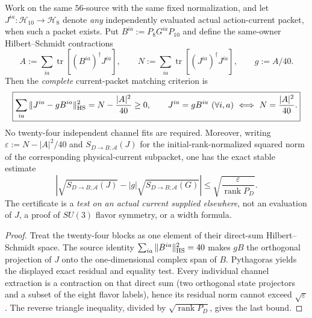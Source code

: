 \documentclass[12pt,a4paper]{article}
\begin{document}
\begin{corollary}
\label{p11:cor:v371-axial-current-gram-test}
Work on the same $56$-source with the same fixed normalization,
and let $J^{ia}:\mathcal H_{10}\to\mathcal H_8$ denote \emph{any}
independently evaluated actual action-current packet, when such a
packet exists.  Put $B^{ia}:=P_8G^{ia}P_{10}$ and define the
same-owner Hilbert--Schmidt contractions
\[
 A:=\sum_{ia}\operatorname{tr}[(B^{ia})^\dagger J^{ia}],
 \qquad N:=\sum_{ia}\operatorname{tr}[(J^{ia})^\dagger J^{ia}],
 \qquad g:=A/40.
\]
Then the \emph{complete} current-packet matching criterion is
\[
 \boxed{\sum_{ia}\|J^{ia}-gB^{ia}\|_{\rm HS}^2
 =N-\frac{|A|^2}{40}\ge0,\qquad
 J^{ia}=gB^{ia}\ (\forall i,a)
 \ \Longleftrightarrow\ N=\frac{|A|^2}{40}.}
\]
No twenty-four independent channel fits are required.  Moreover,
writing $\varepsilon:=N-|A|^2/40$ and $S_{D\to B;\mathcal A}(J)$
for the initial-rank-normalized squared norm of the corresponding
physical-current subpacket, one has the exact stable estimate
\[
 \boxed{\left|\sqrt{S_{D\to B;\mathcal A}(J)}-
 |g|\sqrt{S_{D\to B;\mathcal A}(G)}\right|
 \le\sqrt{\frac{\varepsilon}{\operatorname{rank}P_D}}.}
\]
The certificate is a \emph{test on an actual current supplied elsewhere},
not an evaluation of $J$, a proof of $SU(3)$ flavor symmetry, or a
width formula.
\end{corollary}
\begin{proof}
Treat the twenty-four blocks as one element of their direct-sum
Hilbert--Schmidt space.  The source identity
$\sum_{ia}\|B^{ia}\|_{\rm HS}^2=40$ makes $gB$ the orthogonal
projection of $J$ onto the one-dimensional complex span of $B$.
Pythagoras yields the displayed exact residual and equality test.
Every individual channel extraction is a contraction on that direct
sum (two orthogonal state projectors and a subset of the eight
flavor labels), hence its residual norm cannot exceed
$\sqrt\varepsilon$.  The reverse triangle inequality, divided by
$\sqrt{\operatorname{rank}P_D}$, gives the last bound.
\end{proof}
\end{document}
